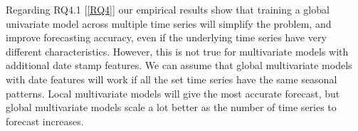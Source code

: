 %


Regarding RQ4.1 [\ref{RQ4}] our empirical results show that training a global univariate model
across multiple time series will simplify the problem, and improve forecasting accuracy, even if the underlying time series
have very different characteristics.
However, this is not true for multivariate models with additional date stamp features.
We can assume that global multivariate models with date features will work if
all the set time series have the same seasonal patterns.
Local multivariate models will give the most accurate forecast, but global multivariate
models scale a lot better as the number of time series to forecast increases.



